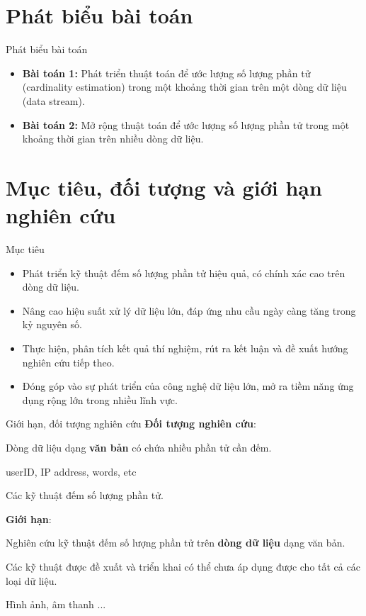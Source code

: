\documentclass[10pt]{beamer}
\newcommand{\SubItem}[1]{
    {\setlength\itemindent{15pt} \item[-] #1}
}
\begin{document}
\section{Phát biểu bài toán}
\begin{frame}[fragile]{Phát biểu bài toán}
  \begin{itemize}
    \item \textbf{Bài toán 1:} Phát triển thuật toán để ước lượng số lượng phần tử (cardinality estimation) trong một khoảng thời gian trên một dòng dữ liệu (data stream).
    \item \textbf{Bài toán 2:} Mở rộng thuật toán để ước lượng số lượng phần tử trong một khoảng thời gian trên nhiều dòng dữ liệu.
  \end{itemize}
\end{frame}
\section{Mục tiêu, đối tượng và giới hạn nghiên cứu}

\begin{frame}{Mục tiêu}
  \begin{itemize}
      \item Phát triển kỹ thuật đếm số lượng phần tử hiệu quả, có chính xác cao trên dòng dữ liệu.
      \item Nâng cao hiệu suất xử lý dữ liệu lớn, đáp ứng nhu cầu ngày càng tăng trong kỷ nguyên số.
      \item Thực hiện, phân tích kết quả thí nghiệm, rút ra kết luận và đề xuất hướng nghiên cứu tiếp theo.
      \item Đóng góp vào sự phát triển của công nghệ dữ liệu lớn, mở ra tiềm năng ứng dụng rộng lớn trong nhiều lĩnh vực.
  \end{itemize}
\end{frame}

\begin{frame}{Giới hạn, đối tượng nghiên cứu}
  \textbf{Đối tượng nghiên cứu}:
    \begin{itemize}
        \item Dòng dữ liệu dạng \textbf{văn bản} có chứa nhiều phần tử cần đếm.
        \SubItem{userID, IP address, words, etc}
        \item Các kỹ thuật đếm số lượng phần tử.
    \end{itemize}
  \textbf{Giới hạn}:
  \begin{itemize}
    \item Nghiên cứu kỹ thuật đếm số lượng phần tử trên \textbf{dòng dữ liệu} dạng văn bản.
    \item Các kỹ thuật được đề xuất và triển khai có thể chưa áp dụng 
    được cho tất cả các loại dữ liệu.
    \SubItem{Hình ảnh, âm thanh ...}
  \end{itemize}
  
\end{frame}
\end{document}
